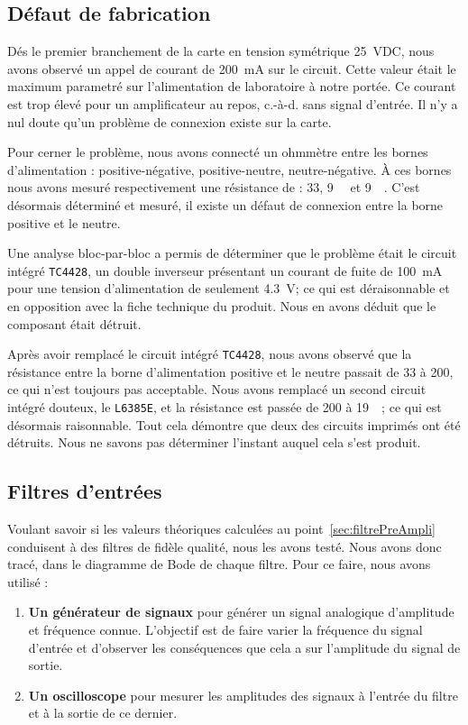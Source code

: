 \documentclass[10pt, oneside, a4paper]{article}
\begin{document}
\subsection{Défaut de fabrication}
Dés le premier branchement de la carte en tension symétrique \pm\SI{25}{\volt}DC,
nous avons observé un appel de courant de \SI{200}{\milli\ampere} sur le circuit.
Cette valeur était le maximum parametré sur l'alimentation de laboratoire à notre portée.
Ce courant est trop élevé pour un amplificateur au repos, c.-à-d. sans signal d'entrée.
Il n'y a nul doute qu'un problème de connexion existe sur la carte.

Pour cerner le problème, nous avons connecté un ohmmètre entre les bornes d'alimentation : positive-négative, positive-neutre, neutre-négative.
À ces bornes nous avons mesuré respectivement une résistance de : \SI{33}{\Omega}, \SI{9}{\kilo\Omega} et \SI{9}{\kilo\Omega}.
C'est désormais déterminé et mesuré, il existe un défaut de connexion entre la borne positive et le neutre.

Une analyse bloc-par-bloc a permis de déterminer que le problème était le circuit intégré \texttt{TC4428}, un double inverseur présentant un courant de fuite de \SI{100}{\milli\ampere} pour une tension d'alimentation de seulement \SI{4.3}{\volt};
ce qui est déraisonnable et en opposition avec la fiche technique du produit.
Nous en avons déduit que le composant était détruit.

Après avoir remplacé le circuit intégré \texttt{TC4428}, nous avons observé que la résistance entre la borne d'alimentation positive et le neutre passait de \SI{33}{\Omega} à \SI{200}{\Omega}, ce qui n'est toujours pas acceptable.
Nous avons remplacé un second circuit intégré douteux, le \verb|L6385E|, et la résistance est passée de \SI{200}{\Omega} à \SI{19}{\kilo\Omega}; ce qui est désormais raisonnable.
Tout cela démontre que deux des circuits imprimés ont été détruits.
Nous ne savons pas déterminer l'instant auquel cela s'est produit.

\subsection{Filtres d'entrées}
Voulant savoir si les valeurs théoriques calculées au point~\ref{sec:filtrePreAmpli}
conduisent à des filtres de fidèle qualité, nous les avons testé.
Nous avons donc tracé, dans le diagramme de Bode de chaque filtre.
Pour ce faire, nous avons utilisé :
\begin{enumerate}
    \item\textbf{Un générateur de signaux} pour générer un signal analogique
        d'amplitude et fréquence connue.
        L'objectif est de faire varier la fréquence du signal d'entrée et d'observer les
        conséquences que cela a sur l'amplitude du signal de sortie.
    \item\textbf{Un oscilloscope} pour mesurer les amplitudes des signaux à l'entrée du
        filtre et à la sortie de ce dernier.
\end{enumerate}
\end{document}
